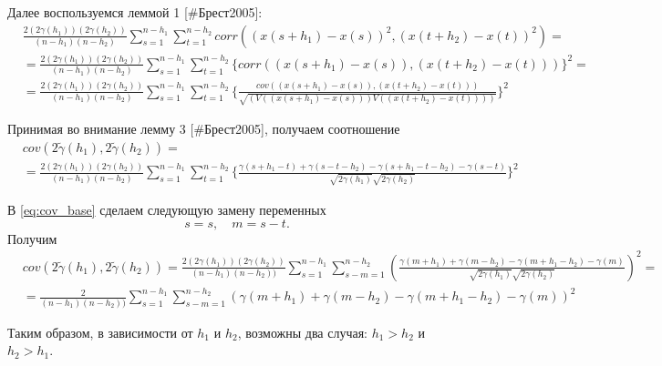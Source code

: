 Далее воспользуемся леммой 1 [\#Брест2005]:
\begin{eqnarray*}
	& \frac{2 (2\gamma(h_1))(2\gamma(h_2))}{(n-h_1)(n-h_2)}\sum_{s=1}^{n-h_1}\sum_{t=1}^{n-h_2} corr((x(s+h_1) - x(s))^2, (x(t+h_2) - x(t))^2) = \\
	& = \frac{2 (2\gamma(h_1))(2\gamma(h_2))}{(n-h_1)(n-h_2)}\sum_{s=1}^{n-h_1}\sum_{t=1}^{n-h_2} \{corr((x(s+h_1) - x(s)), (x(t+h_2) - x(t))) \}^2 = \\
	& = \frac{2 (2\gamma(h_1))(2\gamma(h_2))}{(n-h_1)(n-h_2)}\sum_{s=1}^{n-h_1}\sum_{t=1}^{n-h_2} \{\frac{cov((x(s+h_1) - x(s)), (x(t+h_2) - x(t)))}{\sqrt{(V((x(s+h_1) - x(s))) V((x(t+h_2) - x(t))))}} \}^2
\end{eqnarray*}

Принимая во внимание лемму 3 [\#Брест2005], получаем соотношение
\begin{eqnarray}
\nonumber
\label{eq:cov_base}
	& cov(2 \tilde{\gamma}(h_1), 2 \tilde{\gamma}(h_2)) = \\
	& = \frac{2 (2\gamma(h_1))(2\gamma(h_2))}{(n-h_1)(n-h_2)}\sum_{s=1}^{n-h_1}\sum_{t=1}^{n-h_2} \{\frac{\gamma(s+h_1-t) + \gamma(s-t-h_2) - \gamma(s+h_1-t-h_2) - \gamma(s-t)}{\sqrt{2 \gamma(h_1)} \sqrt{2 \gamma(h_2)}} \}^2
\end{eqnarray}

В \eqref{eq:cov_base} сделаем следующую замену переменных
\begin{equation*}
	s = s, \quad m = s - t.
\end{equation*}
Получим
\begin{eqnarray}
\nonumber
\label{eq:cov_split}
	& cov(2 \tilde{\gamma}(h_1), 2 \tilde{\gamma}(h_2)) = \frac{2(2 \gamma(h_1))(2 \gamma(h_2))}{(n - h_1) (n - h_2))} \sum_{s = 1}^{n - h_1}\sum_{s - m = 1}^{n - h_2} (\frac{\gamma(m + h_1) + \gamma(m - h_2) - \gamma(m + h_1 - h_2) - \gamma(m)}{\sqrt{2 \gamma(h_1)} \sqrt{2 \gamma(h_2)}})^2 = \\
	& = \frac{2}{(n - h_1) (n - h_2))} \sum_{s = 1}^{n - h_1}\sum_{s - m = 1}^{n - h_2} (\gamma(m + h_1) + \gamma(m - h_2) - \gamma(m + h_1 - h_2) - \gamma(m))^2
\end{eqnarray}

Таким образом, в зависимости от $h_1$ и $h_2$, возможны два случая: $h_1 > h_2$ и $h_2 > h_1$.

